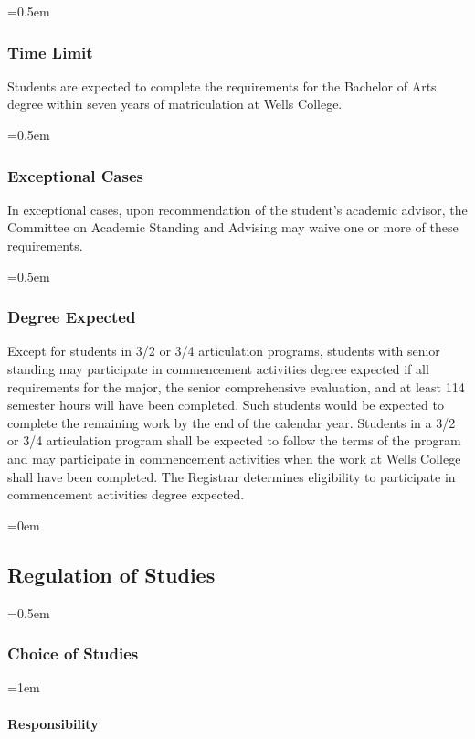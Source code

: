 \documentclass{manual}
\newcommand{\modified}[1]{}
\newcommand{\oldbreak}[1]{}
\let\oldsubsection\subsection
\renewcommand\subsection{\leftskip=0em\oldsubsection}
\let\oldsubsubsection\subsubsection
\renewcommand\subsubsection{\leftskip=0.5em\oldsubsubsection}
\let\oldparagraph\paragraph
\renewcommand\paragraph{\leftskip=1em\oldparagraph}
\begin{document}
\subsubsection{Time Limit}

Students are expected to complete the requirements for the Bachelor of Arts degree within seven years of matriculation at Wells College. 

\subsubsection{Exceptional Cases}

In exceptional cases, upon recommendation of the student's academic advisor, the Committee on Academic Standing and Advising may waive one or more of these requirements.

\subsubsection{Degree Expected}

 Except\modified{9/9/97}  for students in 3/2 or 3/4 articulation programs, students with senior standing may participate in commencement activities degree expected if all requirements for the major, the senior comprehensive evaluation, and at least 114 semester hours will have been completed. Such students would be expected to complete the remaining work by the end of the calendar year. Students in a 3/2 or 3/4 articulation program shall be expected to follow the terms of the program and may participate in commencement activities when the work at Wells College shall have been completed. The Registrar determines eligibility to participate in commencement activities degree expected.



\oldbreak{IV-3}



\subsection{Regulation of Studies}\label{sec:RegulationOfStudies}

\subsubsection{Choice of Studies}\label{sub:ChoiceOfStudies}

\paragraph{Responsibility}
\end{document}
